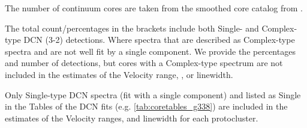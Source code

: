 \begin{table}[htbp!]
\begin{threeparttable}[c]
\begin{tablenotes}
\item[1] The number of continuum cores are taken from the smoothed core catalog from \citet{louvet22}. %
\item[2] The total count/percentages in the brackets include both Single- and Complex-type DCN (3-2) detections. Where spectra that are described as Complex-type spectra and are not well fit by a single component. We provide the percentages and number of detections, but cores with a Complex-type spectrum are not included in the estimates of the Velocity range, \vlsr, or linewidth.
\item[3] Only Single-type DCN spectra (fit with a single component) and listed as Single in the Tables of the DCN fits (e.g. \cref{tab:coretables_g338}) are included in the estimates of the Velocity ranges, \vlsr and linewidth for each protocluster. 
%
%
\end{tablenotes}
\end{threeparttable}
\end{table}